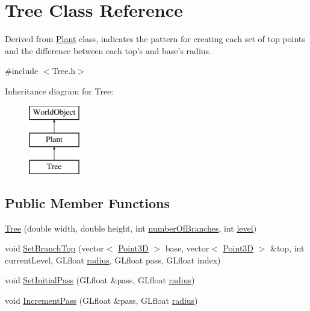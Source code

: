 \hypertarget{class_tree}{\section{Tree Class Reference}
\label{class_tree}
}


Derived from \hyperlink{class_plant}{Plant} class, indicates the pattern for creating each set of top points and the difference between each top's and base's radius.  




{\ttfamily \#include $<$Tree.\+h$>$}

Inheritance diagram for Tree\+:\begin{figure}[H]
\begin{center}
\leavevmode
\includegraphics[height=3.000000cm]{class_tree}
\end{center}
\end{figure}
\subsection*{Public Member Functions}
\begin{DoxyCompactItemize}
\item 
\hyperlink{class_tree_a5f8726222034fdd427bf41abb2f1dced}{Tree} (double width, double height, int \hyperlink{class_plant_a4f86c46865d6211636140cef8805c6ee}{number\+Of\+Branches}, int \hyperlink{class_plant_ab49e92a2ab4ecdc762b5a1711fa3d65f}{level})
\item 
void \hyperlink{class_tree_ab0297a975c2e94b18773edb3e6eaf289}{Set\+Branch\+Top} (vector$<$ \hyperlink{struct_point3_d}{Point3\+D} $>$ base, vector$<$ \hyperlink{struct_point3_d}{Point3\+D} $>$ \&top, int current\+Level, G\+Lfloat \hyperlink{class_plant_abef0f751fe6b1b43ed208966a70b4ab3}{radius}, G\+Lfloat pass, G\+Lfloat index)
\item 
void \hyperlink{class_tree_afe594a748c525993d67ad51e005fc402}{Set\+Initial\+Pass} (G\+Lfloat \&pass, G\+Lfloat \hyperlink{class_plant_abef0f751fe6b1b43ed208966a70b4ab3}{radius})
\item 
void \hyperlink{class_tree_ae5a8dc3f5f4f94cd7cdf75ca1124cbc5}{Increment\+Pass} (G\+Lfloat \&pass, G\+Lfloat \hyperlink{class_plant_abef0f751fe6b1b43ed208966a70b4ab3}{radius})
\end{DoxyCompactItemize}
